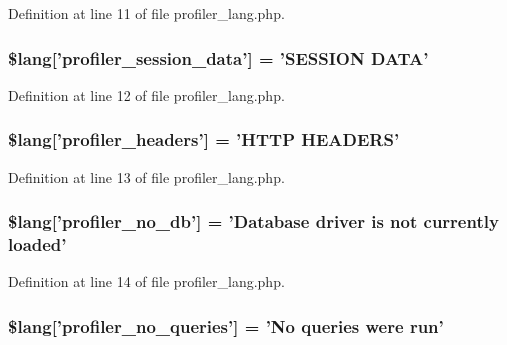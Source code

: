 Definition at line 11 of file profiler\-\_\-lang.\-php.

\hypertarget{profiler__lang_8php_a6caa2b856b3211345f4a916febd79a84}{
\subsubsection[{\$lang}]{\setlength{\rightskip}{0pt plus 5cm}\$lang\mbox{[}'profiler\-\_\-session\-\_\-data'\mbox{]} = 'S\-E\-S\-S\-I\-O\-N D\-A\-T\-A'}}\label{profiler__lang_8php_a6caa2b856b3211345f4a916febd79a84}


Definition at line 12 of file profiler\-\_\-lang.\-php.

\hypertarget{profiler__lang_8php_a079eb6971dec0c6115344e4b621e235f}{
\subsubsection[{\$lang}]{\setlength{\rightskip}{0pt plus 5cm}\$lang\mbox{[}'profiler\-\_\-headers'\mbox{]} = 'H\-T\-T\-P H\-E\-A\-D\-E\-R\-S'}}\label{profiler__lang_8php_a079eb6971dec0c6115344e4b621e235f}


Definition at line 13 of file profiler\-\_\-lang.\-php.

\hypertarget{profiler__lang_8php_a74da0e429477e757130da70e135d4ae9}{
\subsubsection[{\$lang}]{\setlength{\rightskip}{0pt plus 5cm}\$lang\mbox{[}'profiler\-\_\-no\-\_\-db'\mbox{]} = 'Database driver is {\bf not} currently loaded'}}\label{profiler__lang_8php_a74da0e429477e757130da70e135d4ae9}


Definition at line 14 of file profiler\-\_\-lang.\-php.

\hypertarget{profiler__lang_8php_a783abf2a3410bbc9c32e4b7bb774724b}{
\subsubsection[{\$lang}]{\setlength{\rightskip}{0pt plus 5cm}\$lang\mbox{[}'profiler\-\_\-no\-\_\-queries'\mbox{]} = 'No queries were run'}}\label{profiler__lang_8php_a783abf2a3410bbc9c32e4b7bb774724b}



